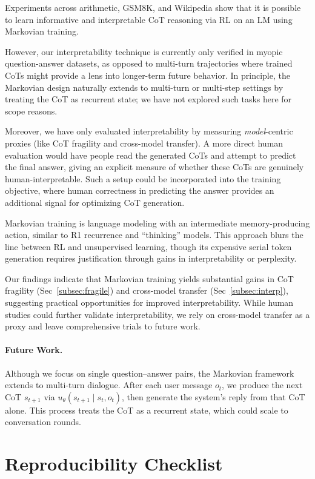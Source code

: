 \documentclass[letterpaper]{article} %
\begin{document}
Experiments across arithmetic, GSM8K, and Wikipedia show that it is possible to learn informative and interpretable CoT reasoning via RL on an LM using Markovian training.

However, our interpretability technique is currently only verified in myopic question-answer datasets, as opposed to multi-turn trajectories where trained CoTs might provide a lens into longer-term future behavior. In principle, the Markovian design naturally extends to multi-turn or multi-step settings by treating the CoT as recurrent state; we have not explored such tasks here for scope reasons.

Moreover, we have only evaluated interpretability by measuring \emph{model}-centric proxies (like CoT fragility and cross-model transfer). A more direct human evaluation would have people read the generated CoTs and attempt to predict the final answer, giving an explicit measure of whether these CoTs are genuinely human-interpretable. Such a setup could be incorporated into the training objective, where human correctness in predicting the answer provides an additional signal for optimizing CoT generation.

Markovian training is language modeling with an intermediate memory-producing action, similar to R1 recurrence and ``thinking'' models. This approach blurs the line between RL and unsupervised learning, though its expensive serial token generation requires justification through gains in interpretability or perplexity.

Our findings indicate that Markovian training yields substantial gains in CoT fragility (Sec~\ref{subsec:fragile}) and cross-model transfer (Sec~\ref{subsec:interp}), suggesting practical opportunities for improved interpretability. While human studies could further validate interpretability, we rely on cross-model transfer as a proxy and leave comprehensive trials to future work.

\paragraph{Future Work.}
Although we focus on single question–answer pairs, the Markovian framework extends to multi-turn dialogue. After each user message $o_t$, we produce the next CoT $s_{t+1}$ via $u_\theta(s_{t+1}\mid s_t,o_t)$, then generate the system's reply from that CoT alone. This process treats the CoT as a recurrent state, which could scale to conversation rounds.




\section*{Reproducibility Checklist}

\def\isChecklistMainFile{}

\end{document}
